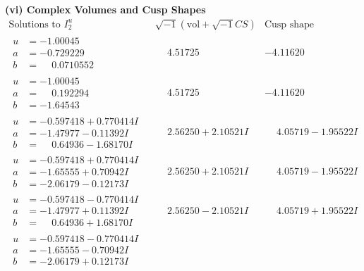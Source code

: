 \documentclass[1p]{elsarticle_modified}
\theoremstyle{definition}
\newcommand{\I}{\sqrt{-1}}
\begin{document}
\newpage\flushleft \textbf{(vi) Complex Volumes and Cusp Shapes}
$$\begin{array}{c|c|c}  
\text{Solutions to }I^u_{2}& \I (\text{vol} + \sqrt{-1}CS) & \text{Cusp shape}\\
 \hline 
\begin{aligned}
u &= -1.00045\phantom{ +0.000000I} \\
a &= -0.729229\phantom{ +0.000000I} \\
b &= \phantom{-}0.0710552\phantom{ +0.000000I}\end{aligned}
 & \phantom{-}4.51725\phantom{ +0.000000I} & -4.11620\phantom{ +0.000000I} \\ \hline\begin{aligned}
u &= -1.00045\phantom{ +0.000000I} \\
a &= \phantom{-}0.192294\phantom{ +0.000000I} \\
b &= -1.64543\phantom{ +0.000000I}\end{aligned}
 & \phantom{-}4.51725\phantom{ +0.000000I} & -4.11620\phantom{ +0.000000I} \\ \hline\begin{aligned}
u &= -0.597418 + 0.770414 I \\
a &= -1.47977 - 0.11392 I \\
b &= \phantom{-}0.64936 - 1.68170 I\end{aligned}
 & \phantom{-}2.56250 + 2.10521 I & \phantom{-}4.05719 - 1.95522 I \\ \hline\begin{aligned}
u &= -0.597418 + 0.770414 I \\
a &= -1.65555 + 0.70942 I \\
b &= -2.06179 - 0.12173 I\end{aligned}
 & \phantom{-}2.56250 + 2.10521 I & \phantom{-}4.05719 - 1.95522 I \\ \hline\begin{aligned}
u &= -0.597418 - 0.770414 I \\
a &= -1.47977 + 0.11392 I \\
b &= \phantom{-}0.64936 + 1.68170 I\end{aligned}
 & \phantom{-}2.56250 - 2.10521 I & \phantom{-}4.05719 + 1.95522 I \\ \hline\begin{aligned}
u &= -0.597418 - 0.770414 I \\
a &= -1.65555 - 0.70942 I \\
b &= -2.06179 + 0.12173 I\end{aligned}

\end{array}$$
\end{document}
